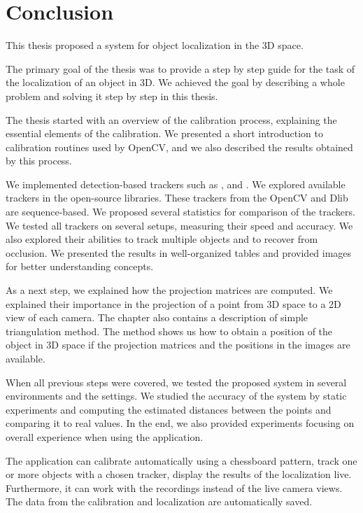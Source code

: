 \chapter*{Conclusion}

This thesis proposed a system for object localization in the 3D space.

The primary goal of the thesis was to provide a step by step guide for the task
of the localization of an object in 3D. We achieved the goal by describing
a whole problem and solving it step by step in this thesis.

The thesis started with an overview of the calibration process, explaining the
essential elements of the calibration. We presented a short introduction to
calibration routines used by OpenCV, and we also described the results
obtained by this process.

We implemented detection-based trackers such as \simback{}, \hsv{} and \patt{}.
We explored available trackers in the open-source libraries. These trackers
from the OpenCV and Dlib are sequence-based. We proposed several statistics for
comparison of the trackers. We tested all trackers on several setups, measuring
their speed and accuracy. We also explored their abilities to track multiple
objects and to recover from occlusion. We presented the results in
well-organized tables and provided images for better understanding concepts.

As a next step, we explained how the projection matrices are computed. We
explained their importance in the projection of a point from 3D space to a 2D
view of each camera. The chapter also contains a description of simple
triangulation method. The method shows us how to obtain a position of the
object in 3D space if the projection matrices and the positions in the images
are available.

When all previous steps were covered, we tested the proposed system in several
environments and the settings. We studied the accuracy of the system by static
experiments and computing the estimated distances between the points and
comparing it to real values. In the end, we also provided experiments focusing
on overall experience when using the application.

The application can calibrate automatically using a chessboard pattern, track
one or more objects with a chosen tracker, display the results of the
localization live. Furthermore, it can work with the recordings instead of the
live camera views. The data from the calibration and localization are
automatically saved.

